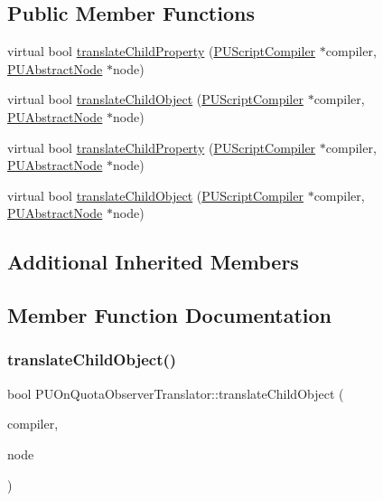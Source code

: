 \subsection*{Public Member Functions}
\begin{DoxyCompactItemize}
\item 
virtual bool \hyperlink{classPUOnQuotaObserverTranslator_a8b6332f1af3cfe7be0ac00bb12003f3b}{translate\+Child\+Property} (\hyperlink{classPUScriptCompiler}{P\+U\+Script\+Compiler} $\ast$compiler, \hyperlink{classPUAbstractNode}{P\+U\+Abstract\+Node} $\ast$node)
\item 
virtual bool \hyperlink{classPUOnQuotaObserverTranslator_a0d6e99af65fca698334b5cf165f48caa}{translate\+Child\+Object} (\hyperlink{classPUScriptCompiler}{P\+U\+Script\+Compiler} $\ast$compiler, \hyperlink{classPUAbstractNode}{P\+U\+Abstract\+Node} $\ast$node)
\item 
virtual bool \hyperlink{classPUOnQuotaObserverTranslator_a26a0c21622c0dd95503071e42dc72fcf}{translate\+Child\+Property} (\hyperlink{classPUScriptCompiler}{P\+U\+Script\+Compiler} $\ast$compiler, \hyperlink{classPUAbstractNode}{P\+U\+Abstract\+Node} $\ast$node)
\item 
virtual bool \hyperlink{classPUOnQuotaObserverTranslator_a1698378c441ca54c9301c69aaf4c26b5}{translate\+Child\+Object} (\hyperlink{classPUScriptCompiler}{P\+U\+Script\+Compiler} $\ast$compiler, \hyperlink{classPUAbstractNode}{P\+U\+Abstract\+Node} $\ast$node)
\end{DoxyCompactItemize}
\subsection*{Additional Inherited Members}


\subsection{Member Function Documentation}
\mbox{\label{classPUOnQuotaObserverTranslator_a0d6e99af65fca698334b5cf165f48caa}} 
\subsubsection{\texorpdfstring{translate\+Child\+Object()}{translateChildObject()}\hspace{0.1cm}{\footnotesize\ttfamily [1/2]}}
{\footnotesize\ttfamily bool P\+U\+On\+Quota\+Observer\+Translator\+::translate\+Child\+Object (\begin{DoxyParamCaption}\item[{\hyperlink{classPUScriptCompiler}{P\+U\+Script\+Compiler} $\ast$}]{compiler,  }\item[{\hyperlink{classPUAbstractNode}{P\+U\+Abstract\+Node} $\ast$}]{node }\end{DoxyParamCaption})\hspace{0.3cm}{\ttfamily [virtual]}}

